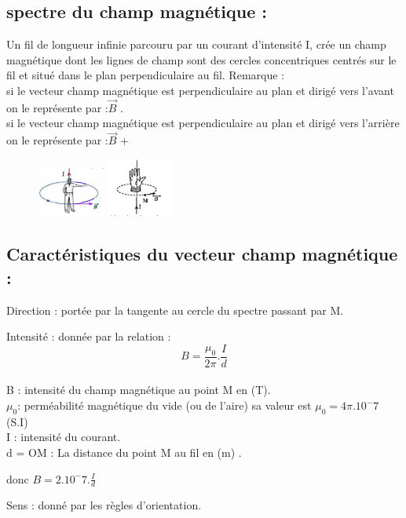 \documentclass[12pt]{article}
\begin{document}
  \subsection{spectre du champ magnétique :}
Un fil de longueur infinie parcouru par un courant
d’intensité I, crée un champ magnétique dont les
lignes de champ sont des cercles concentriques
centrés sur le fil et situé dans le plan perpendiculaire
au fil.
  Remarque :\\ si le vecteur champ magnétique est perpendiculaire au plan et dirigé vers l'avant on le représente par :$\vec{B}$ .
  \\ si le vecteur champ magnétique est perpendiculaire au plan et dirigé vers l'arrière on le représente par :$\vec{B}$ +
\begin{figure}
  \vspace{-1cm}
    \includegraphics[width=0.2\textwidth]{./img/l'observateur.png}
    \includegraphics[width=0.2\textwidth]{./img/main droite.png}
\end{figure}
  \subsection{Caractéristiques du vecteur champ
magnétique :}

  Direction : portée par la tangente au cercle du spectre passant par M.

  Intensité : donnée par la relation : $$B = \frac{\mu_0}{2\pi}.\frac{I}{d}$$ 
  \\B : intensité du champ magnétique au point M en (T).
\\$\mu_0$: perméabilité magnétique du vide (ou de l’aire) sa valeur est $\mu_0 = 4\pi.10^-7$ (S.I)
\\I : intensité du courant.
\\d = OM : La distance du point M au fil en (m) .
 
  donc $B = 2.10^-7.\frac{I}{d}$

  Sens : donné par les règles d’orientation.
\end{document}
